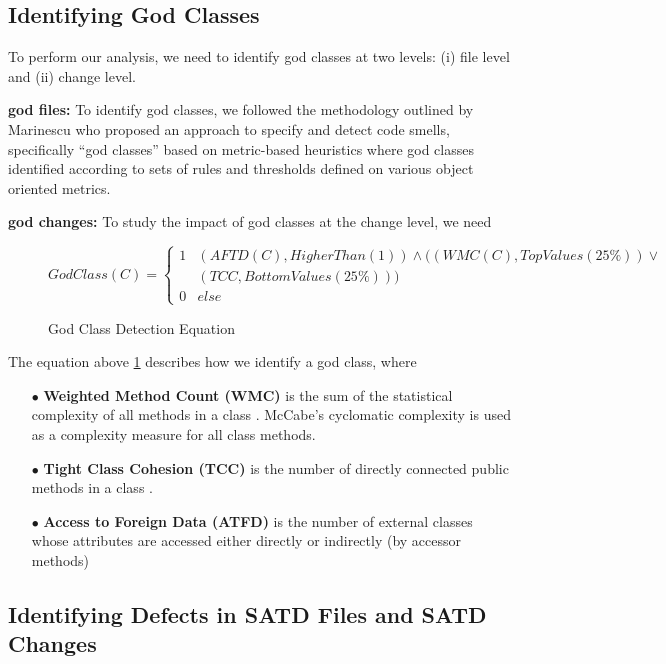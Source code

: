 \subsection{Identifying God Classes}
\label{ch4_god}

To perform our analysis, we need to identify god classes at two levels: (i) file level and (ii) change level.

\textbf{god files:} To identify god classes, we followed the methodology outlined by Marinescu \cite{marinescu2004detection} who proposed an approach to specify and detect
code smells, specifically ``god classes'' based on metric-based heuristics where god classes identified according to sets of rules and thresholds defined on various object oriented metrics.

\noindent\textbf{god changes:}
To study the impact of god classes at the change level, we need 



\begin{figure}[h]
\[GodClass(C) = \left\{\begin{matrix}
1& (AFTD(C), HigherThan(1))  \wedge ((WMC(C), TopValues(25\%)) \vee \\ 
 & (TCC, BottomValues(25\%)))\\ 
0& else
\end{matrix}\right.\]
\caption{God Class Detection Equation}
\label{equation:1}
\end{figure}

The equation above \ref{equation:1} describes how we identify a god class, where 


\begin{itemize}
\item[$\bullet$] \textbf{Weighted Method Count (WMC)} is the sum of the statistical complexity of all methods in a class \cite{Chidamber_Kemerer_94}. McCabe’s cyclomatic complexity \cite{McCabe_1976} is used as a complexity measure for all class methods.
\item[$\bullet$] \textbf{Tight Class Cohesion (TCC)} is the number of directly connected public methods in a class \cite{Bieman:1995:CRO:223427.211856}.
\item[$\bullet$] \textbf{Access to Foreign Data (ATFD)} is the number of external classes whose attributes are accessed either directly or indirectly (by accessor methods) \cite{Marinescu_PhD}
\end{itemize}

\subsection{Identifying Defects in SATD Files and SATD Changes}
\label{ch4_bugs_td}

